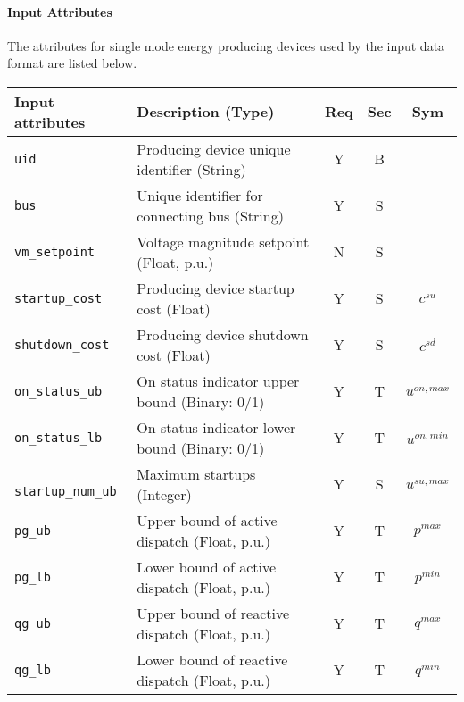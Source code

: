 \documentclass{article}
\begin{document}
\paragraph{Input Attributes} The attributes for 
single mode energy producing devices used by the input data format are listed below.
\begin{center}
\small
\begin{tabular}{ l | l | c | c | c |}
Input attributes & Description (Type) & Req & Sec & Sym\\
\hline
  {\tt uid} & Producing device unique identifier (String) & Y & B &  \\
  {\tt bus} & Unique identifier for connecting bus (String)& Y & S & \\
  {\tt vm\_setpoint} & Voltage magnitude setpoint (Float, p.u.) & N & S & \\
  {\tt startup\_cost} & Producing device startup cost (Float) & Y & S & $c^{su}$\\
  {\tt shutdown\_cost} & Producing device shutdown cost (Float) & Y & S & $c^{sd}$\\  
  {\tt on\_status\_ub} & On status indicator upper bound (Binary: 0/1) & Y & T & $u^{on,max}$\\
  {\tt on\_status\_lb} & On status indicator lower bound (Binary: 0/1) & Y & T & $u^{on,min}$\\
  {\tt\color{red} startup\_num\_ub} & Maximum startups (Integer) & Y & S & $u^{su,max}$\\  
  {\tt pg\_ub} & Upper bound of active dispatch (Float, p.u.) & Y & T & $p^{max}$ \\
  {\tt pg\_lb} & Lower bound of active dispatch (Float, p.u.) & Y & T & $p^{min}$ \\
  {\tt qg\_ub} & Upper bound of reactive dispatch (Float, p.u.)& Y & T & $q^{max}$\\
  {\tt qg\_lb} & Lower bound of reactive dispatch (Float, p.u.)& Y & T & $q^{min}$\\ 


\end{tabular}
\end{center}
\end{document}
